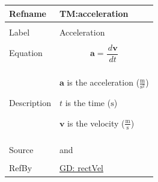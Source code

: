 \documentclass[12pt]{article}
\begin{document}
\vspace{\baselineskip}
\noindent
\begin{minipage}{\textwidth}
\begin{tabular}{>{\raggedright}p{}>{\raggedright\arraybackslash}p{}}
\toprule \textbf{Refname} & \textbf{TM:acceleration}
\label{TM:acceleration}
\\ \midrule \\
Label & Acceleration
        
\\ \midrule \\
Equation & \begin{displaymath}
           \mathbf{a}=\frac{\,d\mathbf{v}}{\,dt}
           \end{displaymath}
\\ \midrule \\
Description & \begin{symbDescription}
              \item{$\mathbf{a}$ is the acceleration ($\frac{\text{m}}{\text{s}^{2}}$)}
              \item{$t$ is the time (${\text{s}}$)}
              \item{$\mathbf{v}$ is the velocity ($\frac{\text{m}}{\text{s}}$)}
              \end{symbDescription}
\\ \midrule \\
Source & \cite{accelerationWiki} and \cite[(pg. 7)]{hibbeler2004}
         
\\ \midrule \\
RefBy & \hyperref[GD:rectVel]{GD: rectVel}
        
\\ \bottomrule
\end{tabular}
\end{minipage}
\vspace{\baselineskip}
\noindent
\end{document}
